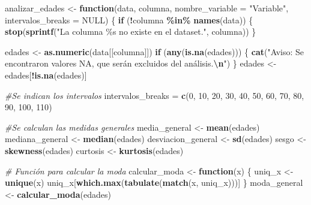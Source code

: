 \documentclass[
]{article}
\newenvironment{Shaded}{\begin{snugshade}}{\end{snugshade}}
\newcommand{\AttributeTok}[1]{\textcolor[rgb]{0.13,0.29,0.53}{#1}}
\newcommand{\CommentTok}[1]{\textcolor[rgb]{0.56,0.35,0.01}{\textit{#1}}}
\newcommand{\ConstantTok}[1]{\textcolor[rgb]{0.56,0.35,0.01}{#1}}
\newcommand{\ControlFlowTok}[1]{\textcolor[rgb]{0.13,0.29,0.53}{\textbf{#1}}}
\newcommand{\DecValTok}[1]{\textcolor[rgb]{0.00,0.00,0.81}{#1}}
\newcommand{\FunctionTok}[1]{\textcolor[rgb]{0.13,0.29,0.53}{\textbf{#1}}}
\newcommand{\NormalTok}[1]{#1}
\newcommand{\OtherTok}[1]{\textcolor[rgb]{0.56,0.35,0.01}{#1}}
\newcommand{\SpecialCharTok}[1]{\textcolor[rgb]{0.81,0.36,0.00}{\textbf{#1}}}
\newcommand{\StringTok}[1]{\textcolor[rgb]{0.31,0.60,0.02}{#1}}
\begin{document}
\label{section9}
\begin{Shaded}
\begin{Highlighting}[]
\NormalTok{analizar\_edades }\OtherTok{\textless{}{-}} \ControlFlowTok{function}\NormalTok{(data, columna, }\AttributeTok{nombre\_variable =} \StringTok{"Variable"}\NormalTok{, }\AttributeTok{intervalos\_breaks =} \ConstantTok{NULL}\NormalTok{) \{}
  \ControlFlowTok{if}\NormalTok{ (}\SpecialCharTok{!}\NormalTok{columna }\SpecialCharTok{\%in\%} \FunctionTok{names}\NormalTok{(data)) \{}
    \FunctionTok{stop}\NormalTok{(}\FunctionTok{sprintf}\NormalTok{(}\StringTok{"La columna \textquotesingle{}\%s\textquotesingle{} no existe en el dataset."}\NormalTok{, columna))}
\NormalTok{  \}}
  
\NormalTok{  edades }\OtherTok{\textless{}{-}} \FunctionTok{as.numeric}\NormalTok{(data[[columna]])}
  \ControlFlowTok{if}\NormalTok{ (}\FunctionTok{any}\NormalTok{(}\FunctionTok{is.na}\NormalTok{(edades))) \{}
    \FunctionTok{cat}\NormalTok{(}\StringTok{"Aviso: Se encontraron valores NA, que serán excluidos del análisis.}\SpecialCharTok{\textbackslash{}n}\StringTok{"}\NormalTok{)}
\NormalTok{  \}}
\NormalTok{  edades }\OtherTok{\textless{}{-}}\NormalTok{ edades[}\SpecialCharTok{!}\FunctionTok{is.na}\NormalTok{(edades)]}
  
  \CommentTok{\#Se indican los intervalos}
\NormalTok{  intervalos\_breaks }\OtherTok{=} \FunctionTok{c}\NormalTok{(}\DecValTok{0}\NormalTok{, }\DecValTok{10}\NormalTok{, }\DecValTok{20}\NormalTok{, }\DecValTok{30}\NormalTok{, }\DecValTok{40}\NormalTok{, }\DecValTok{50}\NormalTok{, }\DecValTok{60}\NormalTok{, }\DecValTok{70}\NormalTok{, }\DecValTok{80}\NormalTok{, }\DecValTok{90}\NormalTok{, }\DecValTok{100}\NormalTok{, }\DecValTok{110}\NormalTok{)}
  
  \CommentTok{\#Se calculan las medidas generales}
\NormalTok{  media\_general }\OtherTok{\textless{}{-}} \FunctionTok{mean}\NormalTok{(edades)}
\NormalTok{  mediana\_general }\OtherTok{\textless{}{-}} \FunctionTok{median}\NormalTok{(edades)}
\NormalTok{  desviacion\_general }\OtherTok{\textless{}{-}} \FunctionTok{sd}\NormalTok{(edades)}
\NormalTok{  sesgo }\OtherTok{\textless{}{-}} \FunctionTok{skewness}\NormalTok{(edades)}
\NormalTok{  curtosis }\OtherTok{\textless{}{-}} \FunctionTok{kurtosis}\NormalTok{(edades)}
  
  \CommentTok{\# Función para calcular la moda}
\NormalTok{  calcular\_moda }\OtherTok{\textless{}{-}} \ControlFlowTok{function}\NormalTok{(x) \{}
\NormalTok{    uniq\_x }\OtherTok{\textless{}{-}} \FunctionTok{unique}\NormalTok{(x)}
\NormalTok{    uniq\_x[}\FunctionTok{which.max}\NormalTok{(}\FunctionTok{tabulate}\NormalTok{(}\FunctionTok{match}\NormalTok{(x, uniq\_x)))]}
\NormalTok{  \}}
\NormalTok{  moda\_general }\OtherTok{\textless{}{-}} \FunctionTok{calcular\_moda}\NormalTok{(edades)}
  

\end{Highlighting}
\end{Shaded}
\end{document}
